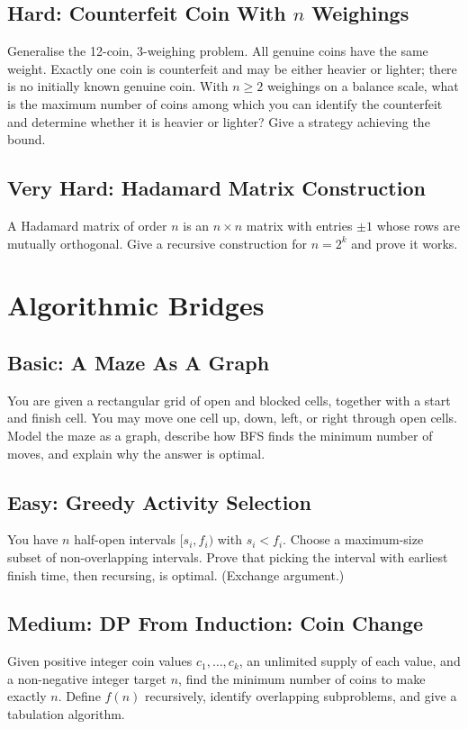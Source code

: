 \documentclass[12pt]{article}
\begin{document}
\subsection*{Hard: Counterfeit Coin With $n$ Weighings}
Generalise the 12-coin, 3-weighing problem. All genuine coins have the
same weight. Exactly one coin is counterfeit and may be either heavier
or lighter; there is no initially known genuine coin. With $n\ge2$
weighings on a balance scale, what is the maximum number of coins
among which you can identify the counterfeit and determine whether it
is heavier or lighter? Give a strategy achieving the bound.

\subsection*{Very Hard: Hadamard Matrix Construction}
A Hadamard matrix of order $n$ is an $n\times n$ matrix with entries
$\pm1$ whose rows are mutually orthogonal. Give a recursive
construction for $n=2^k$ and prove it works.

\section{Algorithmic Bridges}

\subsection*{Basic: A Maze As A Graph}
You are given a rectangular grid of open and blocked cells, together
with a start and finish cell. You may move one cell up, down, left, or
right through open cells. Model the maze as a graph, describe how BFS
finds the minimum number of moves, and explain why the answer is optimal.

\subsection*{Easy: Greedy Activity Selection}
You have $n$ half-open intervals $[s_i, f_i)$ with $s_i<f_i$.
Choose a maximum-size subset of non-overlapping intervals. Prove
that picking the interval with
earliest finish time, then recursing, is optimal. (Exchange argument.)

\subsection*{Medium: DP From Induction: Coin Change}
Given positive integer coin values $c_1, \ldots, c_k$, an unlimited
supply of each value, and a non-negative integer target $n$, find the
minimum number of coins to make exactly $n$. Define $f(n)$ recursively,
identify overlapping subproblems, and give a tabulation algorithm.
\end{document}

